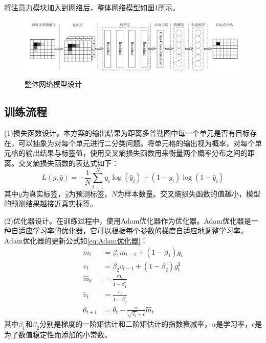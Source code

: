 将注意力模块加入到网络后，整体网络模型如图\ref{fig:整体网络}所示。
\begin{figure}[htbp]
	\centering
	\includegraphics[width=\linewidth]{figures/整体网络.pdf}
	\caption{整体网络模型设计}
	\label{fig:整体网络}
\end{figure}

\subsection{训练流程}
(1)损失函数设计。本方案的输出结果为距离多普勒图中每一个单元是否有目标存在，可以抽象为对每个单元进行二分类问题。将单元格的输出视为概率，对每个单元格的输出结果与标签值，使用交叉熵损失函数用来衡量两个概率分布之间的距离。交叉熵损失函数的表达式如下：
\begin{equation}
	\label{eq:交叉熵损失函数}
	L(y,\hat{y}) = -\frac{1}{N}\sum_{i=1}^{N}y_i\log(\hat{y}_i) + (1-y_i)\log(1-\hat{y}_i)
\end{equation}
其中$y$为真实标签，$\hat{y}$为预测标签，$N$为样本数量。交叉熵损失函数的值越小，模型的预测结果越接近真实标签。

(2)优化器设计。在训练过程中，使用Adam优化器作为优化器。Adam优化器是一种自适应学习率的优化器，它可以根据每个参数的梯度自适应地调整学习率。Adam优化器的更新公式如\eqref{eq:Adam优化器}：
\begin{equation}
	\label{eq:Adam优化器}
	\begin{split}
		m_t &= \beta_1m_{t-1}+(1-\beta_1)g_t \\
		v_t &= \beta_2v_{t-1}+(1-\beta_2)g_t^2 \\
		\hat{m}_t &= \frac{m_t}{1-\beta_1^t} \\
		\hat{v}_t &= \frac{v_t}{1-\beta_2^t} \\
		\theta_{t+1} &= \theta_t - \frac{\alpha}{\sqrt{\hat{v}_t}+\epsilon}\hat{m}_t
	\end{split}
\end{equation}
其中$\beta_1$和$\beta_2$分别是梯度的一阶矩估计和二阶矩估计的指数衰减率，$\alpha$是学习率，$\epsilon$是为了数值稳定性而添加的小常数。

